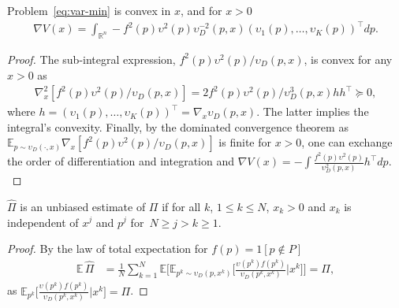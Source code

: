 \begin{theorem}\label{thm:var-convexity}
Problem~\eqref{eq:var-min} is convex in $x$, and for $x > 0$
\begin{align*}
    \nabla V(x) = \int_{\mathbb{R}^n} - f^2 (p)\upsilon^2(p)\upsilon_D^{-2}(p,x) (\upsilon_1(p), \dots, \upsilon_K(p))^\top dp.
\end{align*} 
\end{theorem}
\begin{proof}
The sub-integral expression, $f^2(p)\upsilon^2(p)/\upsilon_D(p,x)$, is convex for any $x > 0$ as
\begin{align*}
    \nabla^2_x \left[f^2(p)\upsilon^2(p)/\upsilon_D(p,x)\right] = 2f^2(p)\upsilon^2(p)/\upsilon^3_D(p,x) h h^\top \!\succeq\! 0,
\end{align*}
where $h = (\upsilon_1(p), \dots, \upsilon_K(p))^\top = \nabla_x \upsilon_D(p,x)$. 
The latter implies the integral's convexity. %
Finally, by the dominated convergence theorem as $\mathbb{E}_{p \sim \upsilon_D(\cdot,x)} \nabla_x\left[f^2(p)\upsilon^2(p)/\upsilon_D(p,x)\right]$ is finite for $x>0$, one can exchange the order of differentiation and integration and 
$\nabla V(x) = -\int \frac{f^2 (p)\upsilon^2(p)}{\upsilon_D^2(p,x)} h^\top dp.$
\end{proof}


\begin{theorem}\label{thm:unbias}
$\hat \Pi$ is an unbiased estimate of $\Pi$ if for all $k$, $1\le k \le N$, $x_k > 0$ and $x_k$ is independent of $x^j$ and $p^j$ for~$N\ge j > k\ge 1$.
\end{theorem}
\begin{proof} 
By the law of total expectation for $f(p) \!=\! 1[p\!\not\in\! P]$
\begin{align*}
    \mathbb{E}\, {\hat\Pi} & = \frac{1}{N}\sum_{k=1}^N  \mathbb{E}\biggl[\mathbb{E}_{p^k\sim\upsilon_D(p, x^k)} \biggl[ \frac{\upsilon(p^k) f(p^k)}{\upsilon_D(p^k,x^k)}\big| x^k\biggr]\biggr] = \Pi, %
\end{align*}
as $\mathbb{E}_{p^k} \bigl[ \frac{\upsilon(p^k)f(p^k)}{\upsilon_D(p^k,x^k)}\big| x^k\bigr] = \Pi$. %
\end{proof}

